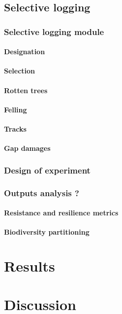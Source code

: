 \documentclass[]{article}
\let\oldparagraph\paragraph
\renewcommand{\paragraph}[1]{\oldparagraph{#1}\mbox{}}
\begin{document}
\subsection{Selective logging}\label{selective-logging}

\subsubsection{Selective logging module}\label{selective-logging-module}

\paragraph{Designation}\label{designation}

\paragraph{Selection}\label{selection}

\paragraph{Rotten trees}\label{rotten-trees}

\paragraph{Felling}\label{felling}

\paragraph{Tracks}\label{tracks}

\paragraph{Gap damages}\label{gap-damages}

\subsubsection{Design of experiment}\label{design-of-experiment-1}

\subsubsection{Outputs analysis ?}\label{outputs-analysis}

\paragraph{Resistance and resilience
metrics}\label{resistance-and-resilience-metrics-1}

\paragraph{Biodiversity partitioning}\label{biodiversity-partitioning-1}

\section{Results}\label{results}

\section{Discussion}\label{discussion}


\end{document}
